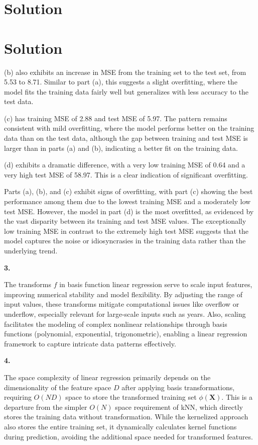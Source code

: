\documentclass[submit]{harvardml}
\newenvironment{solution}
  {\color{blue}\section*{Solution}}
{}
\begin{document}
\begin{solution}
\begin{solution}
(b) also exhibits an increase in MSE from the training set to the test set, from 5.53 to 8.71. Similar to part (a), this suggests a slight overfitting, where the model fits the training data fairly well but generalizes with less accuracy to the test data.
  
(c) has training MSE of 2.88 and test MSE of 5.97. The pattern remains consistent with mild overfitting, where the model performs better on the training data than on the test data, although the gap between training and test MSE is larger than in parts (a) and (b), indicating a better fit on the training data.
  
(d) exhibits a dramatic difference, with a very low training MSE of 0.64 and a very high test MSE of 58.97. This is a clear indication of significant overfitting.

Parts (a), (b), and (c) exhibit signs of overfitting, with part (c) showing the best performance among them due to the lowest training MSE and a moderately low test MSE. However, the model in part (d) is the most overfitted, as evidenced by the vast disparity between its training and test MSE values. The exceptionally low training MSE in contrast to the extremely high test MSE suggests that the model captures the noise or idiosyncrasies in the training data rather than the underlying trend.

\bigskip
\textbf{3.}

The transforms \(f\) in basis function linear regression serve to scale input features, improving numerical stability and model flexibility. By adjusting the range of input values, these transforms mitigate computational issues like overflow or underflow, especially relevant for large-scale inputs such as years. Also, scaling facilitates the modeling of complex nonlinear relationships through basis functions (polynomial, exponential, trigonometric), enabling a linear regression framework to capture intricate data patterns effectively.

\bigskip
\textbf{4.}

The space complexity of linear regression primarily depends on the dimensionality of the feature space \(D\) after applying basis transformations, requiring \(O(ND)\) space to store the transformed training set \( \phi(\mathbf{X}) \). This is a departure from the simpler \(O(N)\) space requirement of kNN, which directly stores the training data without transformation. While the kernelized approach also stores the entire training set, it dynamically calculates kernel functions during prediction, avoiding the additional space needed for transformed features.\\


\end{solution}
\end{solution}
\end{document}
